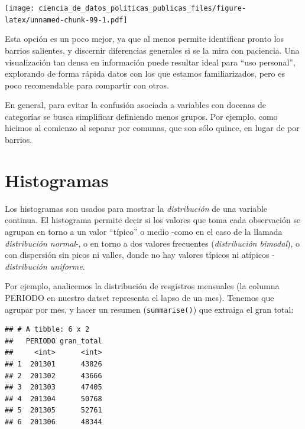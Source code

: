\documentclass[]{book}
\newenvironment{Shaded}{\begin{snugshade}}{\end{snugshade}}
\newcommand{\KeywordTok}[1]{\textcolor[rgb]{0.13,0.29,0.53}{\textbf{#1}}}
\newcommand{\DataTypeTok}[1]{\textcolor[rgb]{0.13,0.29,0.53}{#1}}
\newcommand{\StringTok}[1]{\textcolor[rgb]{0.31,0.60,0.02}{#1}}
\newcommand{\OperatorTok}[1]{\textcolor[rgb]{0.81,0.36,0.00}{\textbf{#1}}}
\newcommand{\NormalTok}[1]{#1}
\begin{document}
\texttt{[image: ciencia\_de\_datos\_politicas\_publicas\_files/figure-latex/unnamed-chunk-99-1.pdf]}

Esta opción es un poco mejor, ya que al menos permite identificar pronto
los barrios salientes, y discernir diferencias generales si se la mira
con paciencia. Una visualización tan densa en información puede resultar
ideal para ``uso personal'', explorando de forma rápida datos con los
que estamos familiarizados, pero es poco recomendable para compartir con
otros.

En general, para evitar la confusión asociada a variables con docenas de
categorías se busca simplificar definiendo menos grupos. Por ejemplo,
como hicimos al comienzo al separar por comunas, que son sólo quince, en
lugar de por barrios.

\section{Histogramas}\label{histogramas}

Los histogramas son usados para mostrar la \emph{distribución} de una
variable continua. El histograma permite decir si los valores que toma
cada observación se agrupan en torno a un valor ``típico'' o medio -como
en el caso de la llamada \emph{distribución normal}-, o en torno a dos
valores frecuentes (\emph{distribución bimodal}), o con dispersión sin
picos ni valles, donde no hay valores típicos ni atípicos -
\emph{distribución uniforme}.

Por ejemplo, analicemos la distribución de resgistros mensuales (la
columna PERIODO en nuestro datset representa el lapso de un mes).
Tenemos que agrupar por mes, y hacer un resumen (\texttt{summarise()})
que extraiga el gran total:

\begin{Shaded}
\end{Shaded}

\begin{verbatim}
## # A tibble: 6 x 2
##   PERIODO gran_total
##     <int>      <int>
## 1  201301      43826
## 2  201302      43666
## 3  201303      47405
## 4  201304      50768
## 5  201305      52761
## 6  201306      48344
\end{verbatim}
\end{document}

